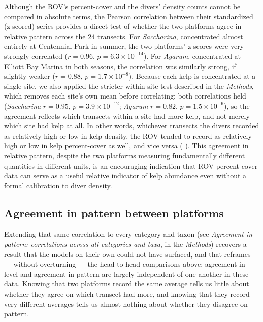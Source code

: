 \documentclass[11pt]{article}
\newcommand{\boxedref}[2]{%
	\begingroup
	\setlength{\fboxrule}{0.8pt}%
	\setlength{\fboxsep}{1.5pt}%
	\textcolor{linkcyan}{%
		\fbox{%
			\textcolor{black}{%
				\hyperref[#2]{#1~\ref*{#2}}%
			}%
		}%
	}%
	\endgroup
}
\newcommand{\figref}[1]{\boxedref{Fig.}{#1}}\newcommand{\tabref}[1]{\boxedref{Table}{#1}}
\begin{document}
Although the ROV's percent-cover and the divers' density counts cannot be
compared in absolute terms, the Pearson correlation between their standardized 
(z-scored) series provides a direct test of whether the two platforms agree in 
relative pattern across the 24 transects.
For \textit{Saccharina}, concentrated almost entirely at Centennial Park in
summer, the two platforms' z-scores were very strongly correlated ($r=0.96$,
$p=6.3\times10^{-14}$).
For \textit{Agarum}, concentrated at Elliott Bay Marina in both seasons, the
correlation was similarly strong, if slightly weaker ($r=0.88$,
$p=1.7\times10^{-8}$).
Because each kelp is concentrated at a single site, we also applied the
stricter within-site test described in the \textit{Methods}, which removes
each site's own mean before correlating; both correlations held
(\textit{Saccharina} $r=0.95$, $p=3.9\times10^{-12}$; \textit{Agarum}
$r=0.82$, $p=1.5\times10^{-6}$), so the agreement reflects which transects
within a site had more kelp, and not merely which site had kelp at all.
In other words, whichever transects the divers recorded as relatively high or
low in kelp density, the ROV tended to record as relatively high or low in
kelp percent-cover as well, and vice versa (\figref{fig:z-scores}).
This agreement in relative pattern, despite the two platforms measuring
fundamentally different quantities in different units, is an encouraging
indication that ROV percent-cover data can serve as a useful relative
indicator of kelp abundance even without a formal calibration to diver
density.

\subsection{Agreement in pattern between platforms}
\label{subsec:correlations_results}

Extending that same correlation to every category and taxon
(see \textit{Agreement in pattern: correlations across all categories and
taxa}, in the \textit{Methods}) recovers a result that the models on their
own could not have surfaced, and that reframes --- without overturning --- the
head-to-head comparisons above: agreement in level and agreement in
pattern are largely independent of one another in these data.
Knowing that two platforms record the same average tells us little about 
whether they agree on which transect had more, and knowing that they record 
very different averages tells us almost nothing about whether they disagree on 
pattern.
\end{document}

